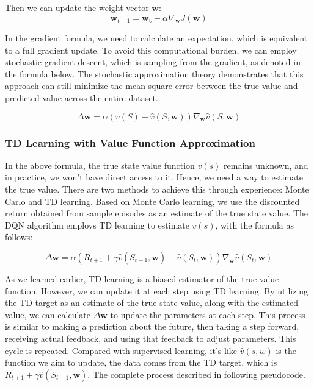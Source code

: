 \documentclass{article}
\begin{document}
Then we can update the weight vector $\mathbf{w}$:
\begin{equation}
\mathbf{w}_{t+1}=\mathbf{w_t}-\alpha \nabla_\mathbf{w} J\left(\mathbf{w}\right)
\end{equation}


In the gradient formula, we need to calculate an expectation, which is equivalent to a full gradient update. To avoid this computational burden, we can employ stochastic gradient descent, which is sampling from the gradient, as denoted in the formula below. The stochastic approximation theory demonstrates that this approach can still minimize the mean square error between the true value and predicted value across the entire dataset.

\begin{equation}
\Delta \mathbf{w}=\alpha\left(v(S)-\hat{v}(S, \mathbf{w})\right) \nabla_{\mathbf{w}} \hat{v}(S, \mathbf{w})
\end{equation}

\newpage
\subsubsection{TD Learning with Value Function Approximation}

In the above formula, the true state value function $v(s)$ remains unknown, and in practice, we won't have direct access to it. Hence, we need a way to estimate the true value. There are two methods to achieve this through experience: Monte Carlo and TD learning. Based on Monte Carlo learning, we use the discounted return obtained from sample episodes as an estimate of the true state value. The DQN algorithm employs TD learning to estimate $v(s)$, with the formula as follows:

\begin{equation}
\Delta \mathbf{w}=\alpha\left(R_{t+1}+\gamma \hat{v}\left(S_{t+1}, \mathbf{w}\right)-\hat{v}\left(S_t, \mathbf{w}\right)\right) \nabla_{\mathbf{w}} \hat{v}\left(S_t, \mathbf{w}\right)
\end{equation}

As we learned earlier, TD learning is a biased estimator of the true value function. However, we can update it at each step using TD learning. By utilizing the TD target as an estimate of the true state value, along with the estimated value, we can calculate $\Delta \mathbf{w}$ to update the parameters at each step. This process is similar to making a prediction about the future, then taking a step forward, receiving actual feedback, and using that feedback to adjust parameters. This cycle is repeated. Compared with supervised learning, it’s like $\hat v(s,w)$ is the function we aim to update, the data comes from the TD target, which is $R_{t+1}+\gamma \hat{v}\left(S_{t+1}, \mathbf{w}\right) $. The complete process described in following pseudocode.\\
\end{document}
